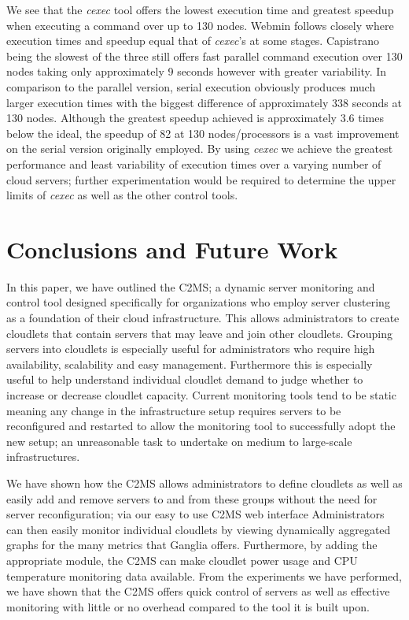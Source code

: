 \documentclass[10pt, conference, compsocconf]{IEEEtran}
\begin{document}
We see that the \textit{cexec} tool offers the lowest execution time and greatest speedup when executing a command over up to 130 nodes. Webmin follows closely where execution times and speedup equal that of \textit{cexec}'s at some stages. Capistrano being the slowest of the three still offers fast parallel command execution over 130 nodes taking only approximately 9 seconds however with greater variability. In comparison to the parallel version, serial execution obviously produces much larger execution times with the biggest difference of approximately 338 seconds at 130 nodes. Although the greatest speedup achieved is approximately 3.6 times below the ideal, the speedup of 82 at 130 nodes/processors is a vast improvement on the serial version originally employed. By using \textit{cexec} we achieve the greatest performance and least variability of execution times over a varying number of cloud servers; further experimentation would be required to determine the upper limits of \textit{cexec} as well as the other control tools.

\section{Conclusions and Future Work}
In this paper, we have outlined the C2MS; a dynamic server monitoring and control tool designed specifically for organizations who employ server clustering as a foundation of their cloud infrastructure. This allows administrators to create cloudlets that contain servers that may leave and join other cloudlets. Grouping servers into cloudlets is especially useful for administrators who require high availability, scalability and easy management. Furthermore this is especially useful to help understand individual cloudlet demand to judge whether to increase or decrease cloudlet capacity. Current monitoring tools tend to be static meaning any change in the infrastructure setup requires servers to be reconfigured and restarted to allow the monitoring tool to successfully adopt the new setup; an unreasonable task to undertake on medium to large-scale infrastructures.

We have shown how the C2MS allows administrators to define cloudlets as well as easily add and remove servers to and from these groups without the need for server reconfiguration; via our easy to use C2MS web interface  Administrators can then easily monitor individual cloudlets by viewing dynamically aggregated graphs for the many metrics that Ganglia offers. Furthermore, by adding the appropriate module, the C2MS can make cloudlet power usage and CPU temperature monitoring data available. From the experiments we have performed, we have shown that the C2MS offers quick control of servers as well as effective monitoring with little or no overhead compared to the tool it is built upon.
\end{document}
